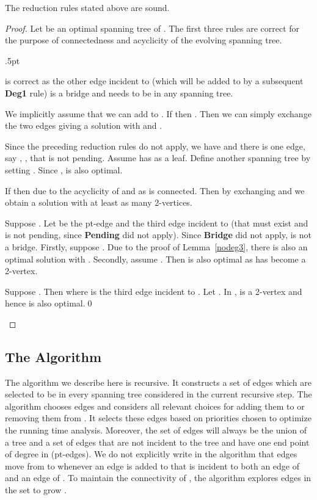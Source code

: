 \documentclass{llncs}
\begin{document}
{\begin{lemma}
The reduction rules stated above are sound.
\end{lemma}
\begin{proof}
Let  be an optimal spanning tree of . The first three rules are correct for the purpose of connectedness and acyclicity of the evolving spanning tree. 
\begin{description}\itemsep.5pt
\item[\bf Pending] is correct as the other edge incident to  (which will be added to  by a subsequent {\bf Deg1} rule) is a bridge and needs to be in any spanning tree. 
\item [\bf ConsDeg2] We implicitly assume that we can add  to . If  then . Then we can simply exchange the two edges giving a solution  with  and .  \item[\bf Deg2] Since the preceding reduction rules do not apply, we have  and there is one edge, say
, , that is not pending. Assume  
has  as a leaf. Define 
another spanning tree  by setting .
Since 
,  is also optimal.   
\item[\bf Attach] If  then  due to the acyclicity of  and as  is connected. Then by exchanging  and  we obtain a solution  with at least as many 2-vertices.
\item[\bf Attach2] Suppose . Let  be the pt-edge and  the third edge incident to  (that must exist and is not pending, since {\bf Pending} did not apply). Since {\bf Bridge} did not apply,  is not a bridge. 
Firstly, suppose . Due to the proof of Lemma~\ref{nodeg3}, there is also an optimal solution  with .
Secondly, assume . Then  is also optimal as  has become a 2-vertex.
\item[Special] Suppose . Then  where  is the third edge incident to . Let . In ,  is a 2-vertex and hence  is also optimal.\qed
\end{description}
\end{proof}


\subsection{The Algorithm}

The algorithm we describe here is recursive. It constructs a set  of edges which are selected to be in every spanning tree considered in the current recursive step. The algorithm chooses edges and considers all relevant choices for adding them to  or removing them from . It selects these edges based on priorities chosen to optimize the running time analysis. Moreover, the set  of edges will always be the union of a tree  and a set of edges  that are not incident to the tree and have one end point of degree  in  (pt-edges). We do not explicitly write in the algorithm that edges move from  to  whenever an edge is added to  that is incident to both an edge of  and an edge of . To maintain the connectivity of , the algorithm explores edges in the set  to grow .

}
\end{document}
